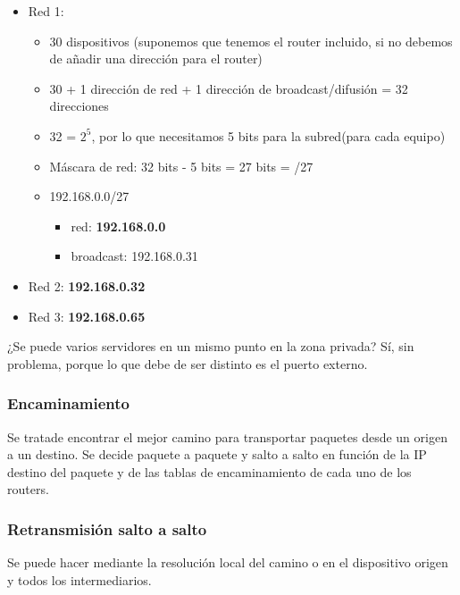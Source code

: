 \documentclass[a4paper,12pt]{article}
\begin{document}
\begin{itemize}
    \item Red 1:
    \begin{itemize}
        \item 30 dispositivos (suponemos que tenemos el router incluido, si no debemos de añadir una dirección para el router)
        \item 30 + 1 dirección de red + 1 dirección de broadcast/difusión = 32 direcciones
        \item 32 = \(2^5\), por lo que necesitamos 5 bits para la subred(para cada equipo) 
        \item Máscara de red: 32 bits - 5 bits = 27 bits = /27
        \item 192.168.0.0/27
        \begin{itemize}
            \item red: \textbf{192.168.0.0}
            \item broadcast: 192.168.0.31
        \end{itemize}
    \end{itemize}
    \item Red 2: \textbf{192.168.0.32}
    \item Red 3: \textbf{192.168.0.65}
\end{itemize}

\begin{tcolorbox}[colback=blue!5!white,colframe=blue!75!black,title=Pregunta de Examen]
    ¿Se puede varios servidores en un mismo punto en la zona privada?
    Sí, sin problema, porque lo que debe de ser distinto es el puerto externo.
    
\end{tcolorbox}

\subsubsection{Encaminamiento}

Se tratade encontrar el mejor camino para transportar paquetes desde un origen a un destino. Se decide paquete a paquete y salto a salto en función de la IP destino del paquete y de las tablas de encaminamiento de cada uno de los routers.

\subsubsection*{Retransmisión salto a salto}
Se puede hacer mediante la resolución local del camino o en el dispositivo origen y todos los intermediarios.
\end{document}
